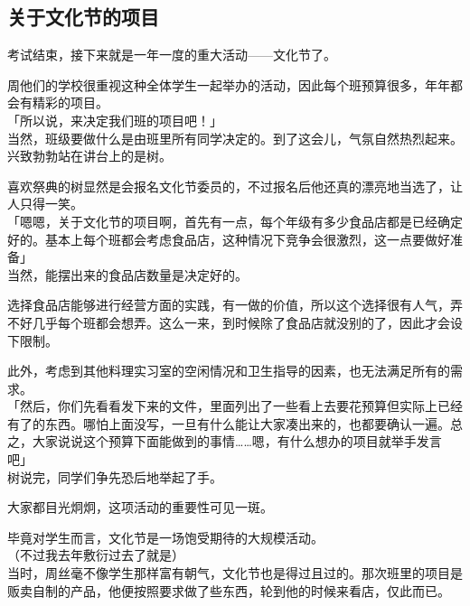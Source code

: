 \subsection{关于文化节的项目}

考试结束，接下来就是一年一度的重大活动——文化节了。

周他们的学校很重视这种全体学生一起举办的活动，因此每个班预算很多，年年都会有精彩的项目。\\

「所以说，来决定我们班的项目吧！」\\

当然，班级要做什么是由班里所有同学决定的。到了这会儿，气氛自然热烈起来。\\

兴致勃勃站在讲台上的是树。

喜欢祭典的树显然是会报名文化节委员的，不过报名后他还真的漂亮地当选了，让人只得一笑。\\

「嗯嗯，关于文化节的项目啊，首先有一点，每个年级有多少食品店都是已经确定好的。基本上每个班都会考虑食品店，这种情况下竞争会很激烈，这一点要做好准备」\\

当然，能摆出来的食品店数量是决定好的。

选择食品店能够进行经营方面的实践，有一做的价值，所以这个选择很有人气，弄不好几乎每个班都会想弄。这么一来，到时候除了食品店就没别的了，因此才会设下限制。

此外，考虑到其他料理实习室的空闲情况和卫生指导的因素，也无法满足所有的需求。\\

「然后，你们先看看发下来的文件，里面列出了一些看上去要花预算但实际上已经有了的东西。哪怕上面没写，一旦有什么能让大家凑出来的，也都要确认一遍。总之，大家说说这个预算下面能做到的事情……嗯，有什么想办的项目就举手发言吧」\\

树说完，同学们争先恐后地举起了手。

大家都目光炯炯，这项活动的重要性可见一斑。

毕竟对学生而言，文化节是一场饱受期待的大规模活动。\\

（不过我去年敷衍过去了就是）\\

当时，周丝毫不像学生那样富有朝气，文化节也是得过且过的。那次班里的项目是贩卖自制的产品，他便按照要求做了些东西，轮到他的时候来看店，仅此而已。\\

